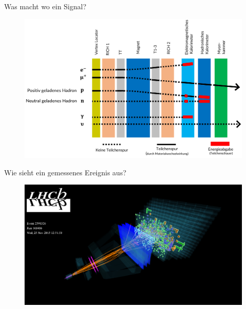 \begin{frame}{Was macht wo ein Signal?}
\begin{figure}[h]
    \centering
    \includegraphics[width=\textwidth]{Figures Introductory Lecture/LHCb Detector/Energy Depostition LHCb.png}
    \label{fig:energy_deposition}
\end{figure}
\end{frame}
\begin{frame}{Wie sieht ein gemessenes Ereignis aus?}
\begin{figure}[h]
    \centering
    \includegraphics[width=\textwidth]{Figures Introductory Lecture/LHCb Detector/LHCb_Eventdisplay.png}
   \label{fig:energy_deposition}
\end{figure}
\end{frame}
